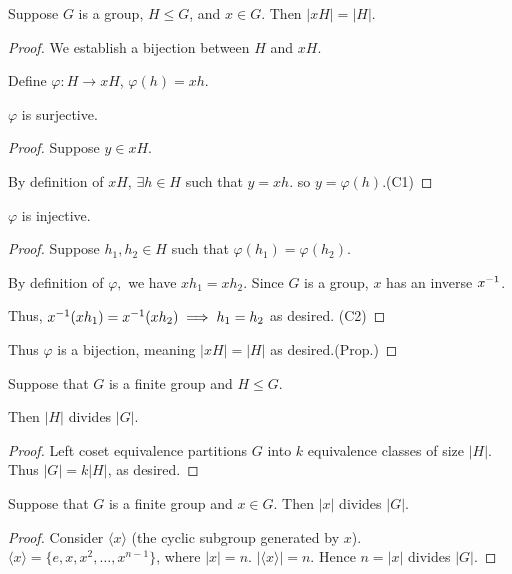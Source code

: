 \documentclass[notes.tex]{subfiles}
\begin{document}
\begin{proposition}
	Suppose $G$ is a group, $H\le G$, and $x\in G$. Then $|xH| = |H|$.
\end{proposition}
\begin{proof}
	We establish a bijection between $H$ and $xH$.

	Define $\varphi:H\to xH$, $\varphi(h) = xh$.

	\begin{claim}[1]
	 	$\varphi$ is surjective.
	 \end{claim} 
	 \begin{proof}
	 	Suppose $y \in xH$. 

	 	By definition of $xH$, $\exists h\in H$ such that $y=xh$. so $y=\varphi(h)$.\qedhere(C1)
	 \end{proof}
	 \begin{claim}[2]
	 	$\varphi$ is injective.
	 \end{claim}
	 \begin{proof}
	 	Suppose $h_1, h_2\in H$ such that $\varphi(h_1) = \varphi(h_2)$.

		By definition of $\varphi,$ we have $xh_1 = xh_2$. Since $G$ is a group, $x$ has an inverse ${x}^{-1}$.

		Thus, ${x}^{-1}(xh_1) = {x}^{-1}(xh_2)\implies h_1=h_2$ as desired. \qedhere(C2)
	 \end{proof}
	
	Thus $\varphi$ is a bijection, meaning $|xH| = |H|$ as desired.\qedhere(Prop.)
\end{proof}

\begin{theorem}[Lagrange]
	Suppose that $G$ is a finite group and $H\le G$.

	Then $|H|$ divides $|G|$.
\end{theorem}
\begin{proof}
	Left coset equivalence partitions $G$ into $k$ equivalence classes of size $|H|$. \\
\hspace{3em}
	Thus $|G| = k|H|$, as desired.
\end{proof}

\begin{corollary}
	Suppose that $G$ is a finite group and $x\in G$. Then $|x|$ divides $|G|$.
\end{corollary}

\begin{proof}
	Consider $\langle x\rangle$ (the cyclic subgroup generated by $x$).
	$\langle x\rangle = \{e, x, x^2, \ldots, x^{n-1}\}$, where $|x| = n$. $|\langle x\rangle| = n$. Hence $n = |x|$ divides $|G|$.
\end{proof}
\end{document}
